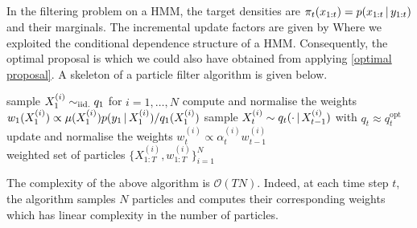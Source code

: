 \subsection{}
In the filtering problem on a HMM, the target densities are $\pi_{t}(x_{1:t})=p(x_{1:t}\,|\, y_{1:t})$ and their marginals. The incremental update factors are given by
Where we exploited the conditional dependence structure of a HMM. Consequently, the optimal proposal is
which we could also have obtained from applying \eqref{optimal proposal}. A skeleton of a particle filter algorithm is given below.
%
\begin{algorithm}[!h]\small
	\caption{\label{alg:particle-filter}}
	\begin{algorithmic}[1]
		\State sample $X_{1}^{(i)}\sim_{\mathrm{iid.}} q_{1}$ for $i=1,\dots,N$	%
		\State compute and normalise the weights $w_{1}(X^{(i)}_{1})\propto {\mu( X^{(i)}_{1})p(y_{1}\,|\,X^{(i)}_{1})/ q_{1}(X^{(i)}_{1})}$
			\State sample $X^{(i)}_{t}\sim q_{t}( \cdot \,|\, X^{(i)}_{t-1})$ with $q_{t}\approx q_{t}^{\text{opt}}$
			\State update and normalise the weights $w^{(i)}_{t}\propto\alpha^{(i)}_{t}w^{(i)}_{t-1}$
		\EndFor\\
		\Return weighted set of particles $\{X^{(i)}_{1:T},w^{(i)}_{1:T}\}_{i=1}^{N}$
	\end{algorithmic}
\end{algorithm}
%

The complexity of the above algorithm is $\mathcal O(TN)$. Indeed, at each time step $t$,  the algorithm samples $N$ particles and computes their corresponding weights which has linear complexity in the number of particles.


